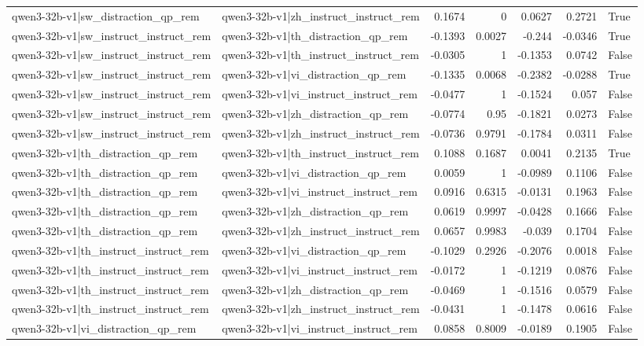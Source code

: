 \begin{table}
\begin{tabular}{l l r r r r l}
qwen3-32b-v1|sw_distraction_qp_rem & qwen3-32b-v1|zh_instruct_instruct_rem & 0.1674 & 0 & 0.0627 & 0.2721 & True \\
qwen3-32b-v1|sw_instruct_instruct_rem & qwen3-32b-v1|th_distraction_qp_rem & -0.1393 & 0.0027 & -0.244 & -0.0346 & True \\
qwen3-32b-v1|sw_instruct_instruct_rem & qwen3-32b-v1|th_instruct_instruct_rem & -0.0305 & 1 & -0.1353 & 0.0742 & False \\
qwen3-32b-v1|sw_instruct_instruct_rem & qwen3-32b-v1|vi_distraction_qp_rem & -0.1335 & 0.0068 & -0.2382 & -0.0288 & True \\
qwen3-32b-v1|sw_instruct_instruct_rem & qwen3-32b-v1|vi_instruct_instruct_rem & -0.0477 & 1 & -0.1524 & 0.057 & False \\
qwen3-32b-v1|sw_instruct_instruct_rem & qwen3-32b-v1|zh_distraction_qp_rem & -0.0774 & 0.95 & -0.1821 & 0.0273 & False \\
qwen3-32b-v1|sw_instruct_instruct_rem & qwen3-32b-v1|zh_instruct_instruct_rem & -0.0736 & 0.9791 & -0.1784 & 0.0311 & False \\
qwen3-32b-v1|th_distraction_qp_rem & qwen3-32b-v1|th_instruct_instruct_rem & 0.1088 & 0.1687 & 0.0041 & 0.2135 & True \\
qwen3-32b-v1|th_distraction_qp_rem & qwen3-32b-v1|vi_distraction_qp_rem & 0.0059 & 1 & -0.0989 & 0.1106 & False \\
qwen3-32b-v1|th_distraction_qp_rem & qwen3-32b-v1|vi_instruct_instruct_rem & 0.0916 & 0.6315 & -0.0131 & 0.1963 & False \\
qwen3-32b-v1|th_distraction_qp_rem & qwen3-32b-v1|zh_distraction_qp_rem & 0.0619 & 0.9997 & -0.0428 & 0.1666 & False \\
qwen3-32b-v1|th_distraction_qp_rem & qwen3-32b-v1|zh_instruct_instruct_rem & 0.0657 & 0.9983 & -0.039 & 0.1704 & False \\
qwen3-32b-v1|th_instruct_instruct_rem & qwen3-32b-v1|vi_distraction_qp_rem & -0.1029 & 0.2926 & -0.2076 & 0.0018 & False \\
qwen3-32b-v1|th_instruct_instruct_rem & qwen3-32b-v1|vi_instruct_instruct_rem & -0.0172 & 1 & -0.1219 & 0.0876 & False \\
qwen3-32b-v1|th_instruct_instruct_rem & qwen3-32b-v1|zh_distraction_qp_rem & -0.0469 & 1 & -0.1516 & 0.0579 & False \\
qwen3-32b-v1|th_instruct_instruct_rem & qwen3-32b-v1|zh_instruct_instruct_rem & -0.0431 & 1 & -0.1478 & 0.0616 & False \\
qwen3-32b-v1|vi_distraction_qp_rem & qwen3-32b-v1|vi_instruct_instruct_rem & 0.0858 & 0.8009 & -0.0189 & 0.1905 & False \\

\end{tabular}
\end{table}
